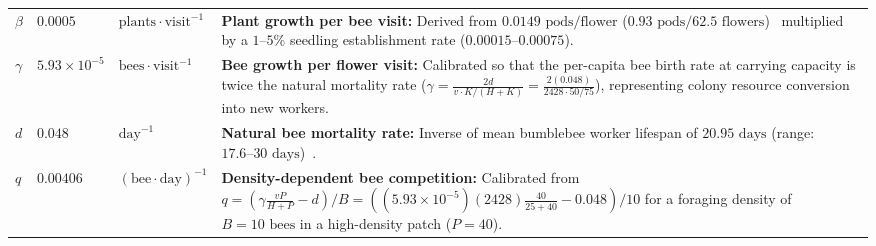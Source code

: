 \documentclass[11pt]{article}
\begin{document}
\begin{table}[htbp]
\begin{tabularx}{\textwidth}{@{} l l l >{\raggedright\arraybackslash}X @{}}
$\beta$ & $0.0005$ & $\text{plants}\cdot\text{visit}^{-1}$ & \textbf{Plant growth per bee visit:} Derived from $0.0149\text{ pods/flower}$ ($0.93\text{ pods} / 62.5\text{ flowers}$)~\cite{woods2012, xerces2018} multiplied by a $1\text{--}5\%$ seedling establishment rate ($0.00015\text{--}0.00075$). \\
$\gamma$ & $5.93 \times 10^{-5}$ & $\text{bees}\cdot\text{visit}^{-1}$ & \textbf{Bee growth per flower visit:} Calibrated so that the per-capita bee birth rate at carrying capacity is twice the natural mortality rate ($\gamma = \frac{2d}{v \cdot K/(H+K)} = \frac{2(0.048)}{2428 \cdot 50/75}$), representing colony resource conversion into new workers. \\
$d$ & $0.048$ & $\text{day}^{-1}$ & \textbf{Natural bee mortality rate:} Inverse of mean bumblebee worker lifespan of $20.95\text{ days}$ (range: $17.6\text{--}30\text{ days}$)~\cite{dasilva2000}. \\
$q$ & $0.00406$ & $(\text{bee}\cdot\text{day})^{-1}$ & \textbf{Density-dependent bee competition:} Calibrated from $q = \left(\gamma \frac{vP}{H+P} - d\right)/B = \left((5.93\times10^{-5})(2428)\frac{40}{25+40} - 0.048\right)/10$ for a foraging density of $B=10\text{ bees}$ in a high-density patch ($P=40$). \\
\bottomrule
\end{tabularx}
\end{table}
\end{document}
